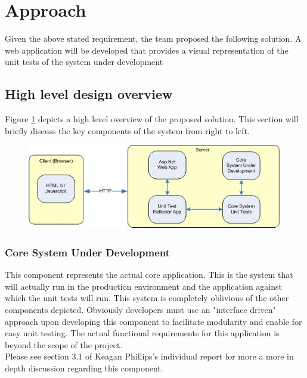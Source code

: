 \documentclass[a4paper,12pt]{article}
\begin{document}
\section{Approach}
Given the above stated requirement, the team proposed the following solution. A web application will be developed that provides a visual representation of the unit tests of the system under development

\subsection{High level design overview}
Figure \ref{fig1} depicts a high level overview of the proposed solution. This section will briefly discuss the key components of the system from right to left.

\begin{center}
	\begin{figure}
		\includegraphics{system_overview.JPG}
			\caption{}
			\label{fig1}    
	\end{figure}	
\end{center}

\subsubsection{Core System Under Development}
This component represents the actual core application. This is the system that will actually run in the production environment and the application against which the unit tests will run. This system is completely oblivious of the other components depicted. Obviously developers must use an "interface driven" approach upon developing this component to facilitate modularity and enable for easy unit testing. The actual functional requirements for this application is beyond the scope of the project.\\
\linebreak
Please see section 3.1 of Keagan Phillips's individual report\cite{reportKeagan} for more a more in depth discussion regarding this component. 
\end{document}
